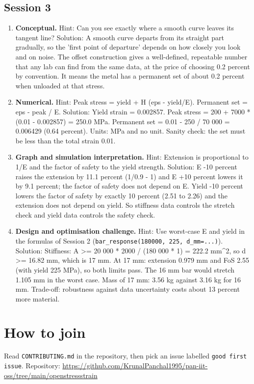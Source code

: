 \documentclass[11pt,a4paper]{article}
\begin{document}
\subsection*{Session 3}
\begin{enumerate}[nosep]
\item \textbf{Conceptual.} Hint: Can you see exactly where a smooth curve leaves its tangent line? Solution: A smooth curve departs from its straight part gradually, so the 'first point of departure' depends on how closely you look and on noise. The offset construction gives a well-defined, repeatable number that any lab can find from the same data, at the price of choosing 0.2 percent by convention. It means the metal has a permanent set of about 0.2 percent when unloaded at that stress.
\item \textbf{Numerical.} Hint: Peak stress = yield + H (eps - yield/E). Permanent set = eps - peak / E. Solution: Yield strain = 0.002857. Peak stress = 200 + 7000 * (0.01 - 0.002857) = 250.0 MPa. Permanent set = 0.01 - 250 / 70 000 = 0.006429 (0.64 percent). Units: MPa and no unit. Sanity check: the set must be less than the total strain 0.01.
\item \textbf{Graph and simulation interpretation.} Hint: Extension is proportional to 1/E and the factor of safety to the yield strength. Solution: E -10 percent raises the extension by 11.1 percent (1/0.9 - 1) and E +10 percent lowers it by 9.1 percent; the factor of safety does not depend on E. Yield -10 percent lowers the factor of safety by exactly 10 percent (2.51 to 2.26) and the extension does not depend on yield. So stiffness data controls the stretch check and yield data controls the safety check.
\item \textbf{Design and optimisation challenge.} Hint: Use worst-case E and yield in the formulas of Session 2 (\texttt{bar\_response(180000, 225, d\_mm=...)}). Solution: Stiffness: A \textgreater{}= 20 000 * 2000 / (180 000 * 1) = 222.2 mm\textasciicircum{}2, so d \textgreater{}= 16.82 mm, which is 17 mm. At 17 mm: extension 0.979 mm and FoS 2.55 (with yield 225 MPa), so both limits pass. The 16 mm bar would stretch 1.105 mm in the worst case. Mass of 17 mm: 3.56 kg against 3.16 kg for 16 mm. Trade-off: robustness against data uncertainty costs about 13 percent more material.
\end{enumerate}

\section{How to join}
Read \texttt{CONTRIBUTING.md} in the repository, then pick an issue labelled \texttt{good first issue}. Repository: \url{https://github.com/KrunalPanchal1995/pan-iit-oss/tree/main/openstressstrain}
\end{document}
